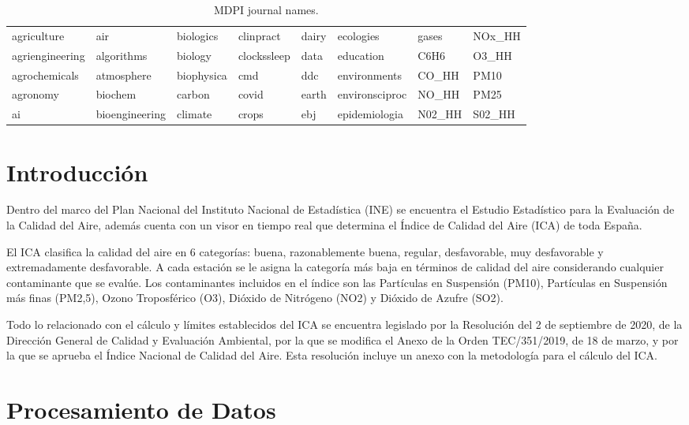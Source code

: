 \documentclass[notspecified,article,submit,moreauthors,pdftex]{Definitions/mdpi}
\begin{document}
\startlandscape

\begin{longtable}[t]{llllllll}
\caption{\label{tab:mdpinames}MDPI journal names.}\\
\toprule
agriculture & air & biologics & clinpract & dairy & ecologies & gases & NOx\_HH\\
agriengineering & algorithms & biology & clockssleep & data & education & C6H6 & O3\_HH\\
agrochemicals & atmosphere & biophysica & cmd & ddc & environments & CO\_HH & PM10\\
agronomy & biochem & carbon & covid & earth & environsciproc & NO\_HH & PM25\\
ai & bioengineering & climate & crops & ebj & epidemiologia & N02\_HH & S02\_HH\\
\bottomrule
\end{longtable}
\finishlandscape

\hypertarget{introducciuxf3n}{%
\section{Introducción}\label{introducciuxf3n}}

Dentro del marco del Plan Nacional del Instituto Nacional de Estadística
(INE) se encuentra el Estudio Estadístico para la Evaluación de la
Calidad del Aire, además cuenta con un visor en tiempo real que
determina el Índice de Calidad del Aire (ICA) de toda España.

El ICA clasifica la calidad del aire en 6 categorías: buena,
razonablemente buena, regular, desfavorable, muy desfavorable y
extremadamente desfavorable. A cada estación se le asigna la categoría
más baja en términos de calidad del aire considerando cualquier
contaminante que se evalúe. Los contaminantes incluidos en el índice son
las Partículas en Suspensión (PM10), Partículas en Suspensión más finas
(PM2,5), Ozono Troposférico (O3), Dióxido de Nitrógeno (NO2) y Dióxido
de Azufre (SO2).

Todo lo relacionado con el cálculo y límites establecidos del ICA se
encuentra legislado por la Resolución del 2 de septiembre de 2020, de la
Dirección General de Calidad y Evaluación Ambiental, por la que se
modifica el Anexo de la Orden TEC/351/2019, de 18 de marzo, y por la que
se aprueba el Índice Nacional de Calidad del Aire. Esta resolución
incluye un anexo con la metodología para el cálculo del ICA.

\hypertarget{procesamiento-de-datos}{%
\section{Procesamiento de Datos}\label{procesamiento-de-datos}}
\end{document}
